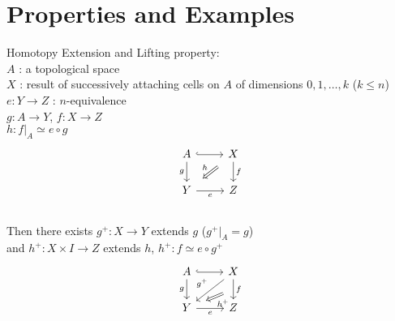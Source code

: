     \section{Properties and Examples}

    \begin{thm}
        Homotopy Extension and Lifting property\label{hyp:HELP}:\\
        $A$ : a topological space\\
        $X$ : result of successively attaching cells on $A$ of dimensions $0,1,\dots,k$ ($k \leq n$)\\
        $e : Y \to Z$ : $n$-equivalence\\
        $g : A \to Y$, $f : X \to Z$\\
        $h : f|_A  \simeq e \circ g $\\

        \[\begin{tikzcd}
            A & X \\
            Y & Z
            \arrow["g"', from=1-1, to=2-1]
            \arrow[hook, from=1-1, to=1-2]
            \arrow["f", from=1-2, to=2-2]
            \arrow["e"', from=2-1, to=2-2]
            \arrow["h"', shorten <=7pt, shorten >=7pt, Rightarrow, from=1-2, to=2-1]
        \end{tikzcd}\]\\
        Then there exists
        $g^+ : X \to Y$ extends $g$ ($g^+|_A = g$)\\
        and $h^+ : X \times I \to Z$ extends $h$, $h^+ : f \simeq e \circ g^+$
        \[\begin{tikzcd}
            A & X \\
            Y & Z
            \arrow["g"', from=1-1, to=2-1]
            \arrow[hook, from=1-1, to=1-2]
            \arrow[""{name=0, anchor=center, inner sep=0}, "f", from=1-2, to=2-2]
            \arrow["e"', from=2-1, to=2-2]
            \arrow["{g^+}"', from=1-2, to=2-1]
            \arrow["{h^+}", shorten <=9pt, shorten >=9pt, Rightarrow, from=0, to=2-1]
        \end{tikzcd}\]
    \end{thm}

